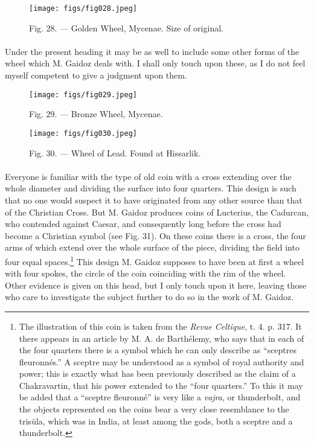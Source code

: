 \documentclass[a4paper, 11pt, oneside, polutonikogreek, english]{article}
\begin{document}
\begin{figure}[H]
\centering
\texttt{[image: figs/fig028.jpeg]}
\caption[Fig. 28. --- Golden Wheel, Mycenae.]{Fig. 28. --- Golden Wheel, Mycenae. Size of original.\footnotemark}
\end{figure}
\paragraph{}
Under the present heading it may be as well to include some other forms of the wheel which M. Gaidoz deals with. I shall only touch upon these, as I do not feel myself competent to give a judgment upon them.

\begin{figure}[H]
\centering
\texttt{[image: figs/fig029.jpeg]}
\caption[Fig. 29. --- Bronze Wheel, Mycenae.]{Fig. 29. --- Bronze Wheel, Mycenae.\footnotemark}
\end{figure}

\begin{figure}[H]
\centering
\texttt{[image: figs/fig030.jpeg]}
\caption[Fig. 30. --- Wheel of Lead.]{Fig. 30. --- Wheel of Lead. Found at Hissarlik.\footnotemark}
\end{figure}
\paragraph{}
Everyone is familiar with the type of old coin with a cross extending over the whole diameter and dividing the surface into four quarters. This design is such that no one would suspect it to have originated from any other source than that of the Christian Cross. But M. Gaidoz produces coins of Lucterius, the Cadurcan, who contended against Caesar, and consequently long before the cross had become a Christian symbol (see Fig. 31). On these coins there is a cross, the four arms of which extend over the whole surface of the piece, dividing the field into four equal spaces.\footnote{The illustration of this coin is taken from the \emph{Revue Celtique}, t. 4. p. 317. It there appears in an article by M. A. de Barthélemy, who says that in each of the four quarters there is a symbol which he can only describe as ``sceptres fleuronnés.'' A sceptre may be understood as a symbol of royal authority and power; this is exactly what has been previously described as the claim of a Chakravartin, that his power extended to the ``four quarters.'' To this it may be added that a ``sceptre fleuronné'' is very like a \emph{vajra}, or thunderbolt, and the objects represented on the coins bear a very close resemblance to the trisūla, which was in India, at least among the gods, both a sceptre and a thunderbolt.} This design M. Gaidoz supposes to have been at first a wheel with four spokes, the circle of the coin coinciding with the rim of the wheel. Other evidence is given on this head, but I only touch upon it here, leaving those who care to investigate the subject further to do so in the work of M. Gaidoz.
\end{document}
